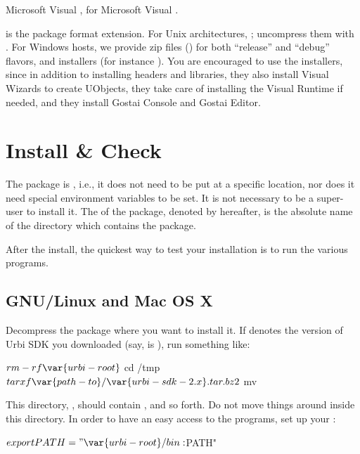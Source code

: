 \begin{description}
  Microsoft Visual ,  for Microsoft Visual
  .
\item[\var{ext}] is the package format extension.  For Unix architectures,
  ; uncompress them with .  For
  Windows hosts, we provide zip files () for both ``release''
  and ``debug'' flavors, and installers (for instance ).  You
  are encouraged to use the installers, since in addition to installing
  headers and libraries, they also install Visual \Cxx Wizards to create
  UObjects, they take care of installing the Visual Runtime if needed, and
  they install Gostai Console and Gostai Editor.
\end{description}

\section{Install \&{} Check}
\label{sec:install:install}

The package is , i.e., it does not need to be put at
a specific location, nor does it need special environment variables to
be set.  It is not necessary to be a super-user to install it.  The
 of the package, denoted by  hereafter, is
the absolute name of the directory which contains the package.

After the install, the quickest way to test your installation is to run
the various programs.

\subsection{GNU/Linux and Mac OS X}

Decompress the package where you want to install it.  If 
denotes the version of Urbi SDK you downloaded (say,  is
), run something like:

\begin{shell}
$ rm -rf \var{urbi-root}
$ cd /tmp
$ tar xf \var{path-to}/\var{urbi-sdk-2.x}.tar.bz2
$ mv  
\end{shell}

This directory, , should contain , 
and so forth.  Do not move things around inside this directory.  In order to
have an easy access to the \urbi programs, set up your :

\begin{shell}[style=varInString]
$ export PATH="\var{urbi-root}/bin:$PATH"
\end{shell}%

